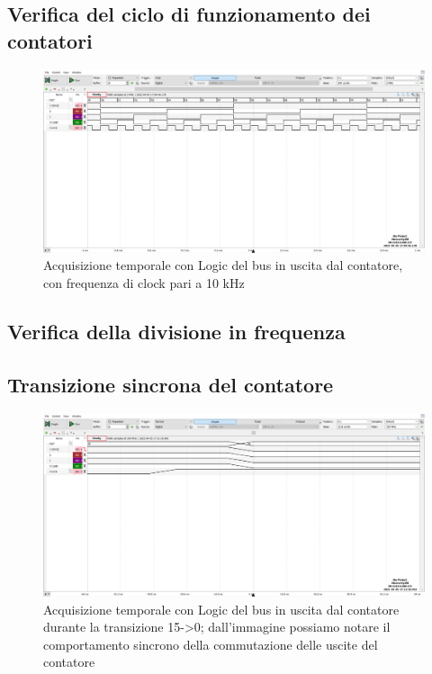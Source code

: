 \documentclass[10pt, a4paper, italian]{article}
\begin{document}
\subsection{Verifica del ciclo di funzionamento dei contatori}
\begin{figure}[htbp]
\centering
	\includegraphics[width=\textwidth]{5.b}
	\caption{Acquisizione temporale con Logic del bus in uscita dal contatore, con frequenza di clock pari a 10 kHz \label{fig: Count_Clock}}
\end{figure}

\subsection{Verifica della divisione in frequenza}

\subsection{Transizione sincrona del contatore}

\begin{figure}[htbp]
\centering
	\includegraphics[width=\textwidth]{5.d}
	\caption{Acquisizione temporale con Logic del bus in uscita dal contatore durante la transizione 15->0; dall'immagine possiamo notare il comportamento sincrono della commutazione delle uscite del contatore \label{fig: Count_150}}
\end{figure}
\end{document}
